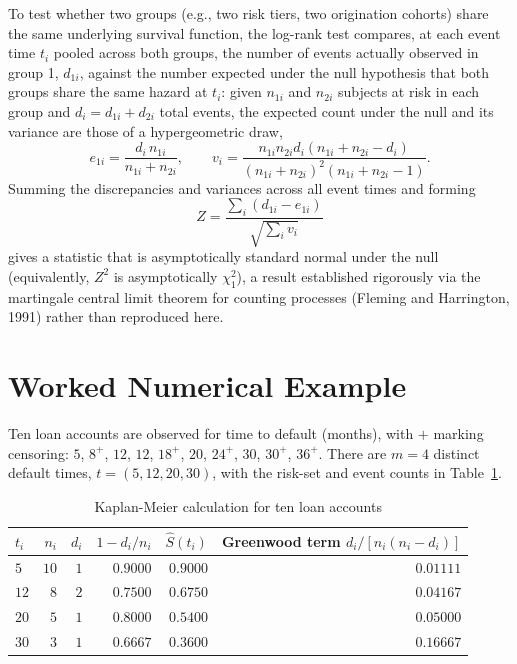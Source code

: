 \documentclass[11pt]{article}
\theoremstyle{remark}
\theoremstyle{definition}
\begin{document}
To test whether two groups (e.g., two risk tiers, two origination cohorts) share the same underlying survival function, the log-rank test compares, at each event time $t_i$ pooled across both groups, the number of events actually observed in group 1, $d_{1i}$, against the number expected under the null hypothesis that both groups share the same hazard at $t_i$: given $n_{1i}$ and $n_{2i}$ subjects at risk in each group and $d_i=d_{1i}+d_{2i}$ total events, the expected count under the null and its variance are those of a hypergeometric draw,
\begin{equation*}
e_{1i}=\frac{d_i\,n_{1i}}{n_{1i}+n_{2i}},
\qquad
v_i = \frac{n_{1i}n_{2i}d_i(n_{1i}+n_{2i}-d_i)}{(n_{1i}+n_{2i})^2(n_{1i}+n_{2i}-1)}.
\end{equation*}
Summing the discrepancies and variances across all event times and forming
\begin{equation*}
Z = \frac{\sum_i (d_{1i}-e_{1i})}{\sqrt{\sum_i v_i}}
\end{equation*}
gives a statistic that is asymptotically standard normal under the null (equivalently, $Z^2$ is asymptotically $\chi^2_1$), a result established rigorously via the martingale central limit theorem for counting processes (Fleming and Harrington, 1991) rather than reproduced here.

\section{Worked Numerical Example}
\label{sec:example}

Ten loan accounts are observed for time to default (months), with $+$ marking censoring: $5$, $8^{+}$, $12$, $12$, $18^{+}$, $20$, $24^{+}$, $30$, $30^{+}$, $36^{+}$. There are $m=4$ distinct default times, $t=(5,12,20,30)$, with the risk-set and event counts in Table~\ref{tab:km}.

\begin{table}[htbp]
\centering
\caption{Kaplan-Meier calculation for ten loan accounts}
\label{tab:km}
\begin{tabular}{@{}lrrrrr@{}}
\toprule
$t_i$ & $n_i$ & $d_i$ & $1-d_i/n_i$ & $\hat S(t_i)$ & Greenwood term $d_i/[n_i(n_i-d_i)]$ \\
\midrule
$5$  & $10$ & $1$ & $0.9000$ & $0.9000$ & $0.01111$ \\
$12$ & $8$  & $2$ & $0.7500$ & $0.6750$ & $0.04167$ \\
$20$ & $5$  & $1$ & $0.8000$ & $0.5400$ & $0.05000$ \\
$30$ & $3$  & $1$ & $0.6667$ & $0.3600$ & $0.16667$ \\
\bottomrule
\end{tabular}
\end{table}
\end{document}
